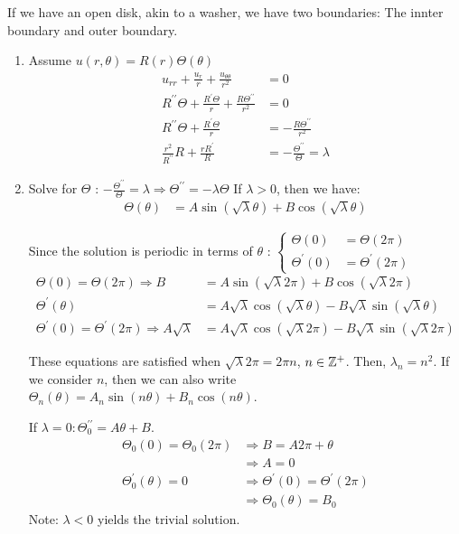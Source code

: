 \documentclass{article}
\begin{document}
If we have an open disk, akin to a washer, we have two boundaries: The innter boundary and outer boundary.
%
\begin{enumerate}
  \item Assume $u(r, \theta) = R(r) \Theta(\theta)$
  \begin{align}
    u_{rr} + \frac{u_r}{r} + \frac{u_{\theta\theta}}{r^2} & = 0\\
    R^{\prime\prime}\Theta + \frac{R^\prime \Theta}{r} + \frac{R\Theta^{\prime\prime}}{r^2} & = 0\\
    R^{\prime\prime} \Theta + \frac{R^\prime \Theta}{r} & = - \frac{R \Theta^{\prime\prime}}{r^2}\\
    \frac{r^2}{R^{\prime\prime}}{R} + \frac{r R^\prime}{R} & = - \frac{\Theta^{\prime\prime}}{\Theta} = \lambda
  \end{align}

  \item Solve for $\Theta$ : $-\frac{\Theta^{\prime\prime}}{\Theta} = \lambda \Rightarrow \Theta^{\prime\prime} = -\lambda \Theta$
  If $\lambda > 0$, then we have:
  \begin{align}
    \Theta(\theta) & = A \sin(\sqrt \lambda \theta) + B \cos(\sqrt \lambda \theta)
  \end{align}

  Since the solution is periodic in terms of $\theta$ :
  $\displaystyle
  \begin{cases}
    \Theta(0) & = \Theta(2 \pi)\\
    \Theta^\prime(0) & = \Theta^\prime(2 \pi)
  \end{cases}$
  \begin{align}
    \Theta(0) = \Theta(2 \pi) \Rightarrow B & = A \sin(\sqrt \lambda 2 \pi) + B \cos ( \sqrt \lambda 2 \pi)\\
    \Theta^\prime(\theta) & = A \sqrt \lambda \cos(\sqrt \lambda \theta) - B \sqrt \lambda \sin( \sqrt \lambda \theta)\\
    \Theta^\prime(0) = \Theta^\prime(2 \pi) \Rightarrow A \sqrt \lambda & = A \sqrt \lambda \cos(\sqrt \lambda 2 \pi) - B \sqrt \lambda \sin(\sqrt \lambda 2 \pi)
  \end{align}

  These equations are satisfied when $\sqrt \lambda 2 \pi = 2 \pi n$, $n \in \mathbb Z^+$. Then, $\lambda_n = n^2$. If we consider $n$, then we can also write $\Theta_n(\theta) = A_n \sin(n \theta) + B_n \cos(n \theta)$.

  If $\lambda = 0 : \Theta^{\prime\prime}_0 = A \theta + B$.
  \begin{align}
    \Theta_0(0) = \Theta_0(2 \pi) & \Rightarrow B = A 2\pi + \theta\\
    & \Rightarrow A = 0\\
    \Theta^\prime_0 (\theta) = 0 & \Rightarrow \Theta^\prime(0) = \Theta^\prime(2 \pi)\\
    & \Rightarrow \Theta_0(\theta) = B_0
  \end{align}
  Note: $\lambda < 0$ yields the trivial solution.


\end{enumerate}
\end{document}
